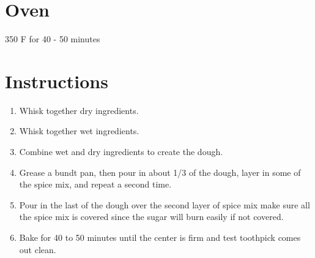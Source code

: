 \documentclass[letterpaper,10pt,english]{sphinxmanual}
\begin{document}

%
\begin{sphinxVerbatim}[commandchars=\\\{\}]
  
  
\end{sphinxVerbatim}


\section{Oven}
\label{\detokenize{spice_cake:oven}}
350 F for 40 - 50 minutes


\section{Instructions}
\label{\detokenize{spice_cake:instructions}}\begin{enumerate}
\item {} 
Whisk together dry ingredients.

\item {} 
Whisk together wet ingredients.

\item {} 
Combine wet and dry ingredients to create the dough.

\item {} 
Grease a bundt pan, then pour in about 1/3 of the dough, layer in some of the spice mix, and repeat a second time.

\item {} 
Pour in the last of the dough over the second layer of spice mix \textendash{} make sure all the spice mix is covered since the sugar will burn easily if not covered.

\item {} 
Bake for 40 to 50 minutes until the center is firm and test toothpick comes out clean.

\end{enumerate}



\renewcommand{\indexname}{Index}
\printindex
\end{document}
